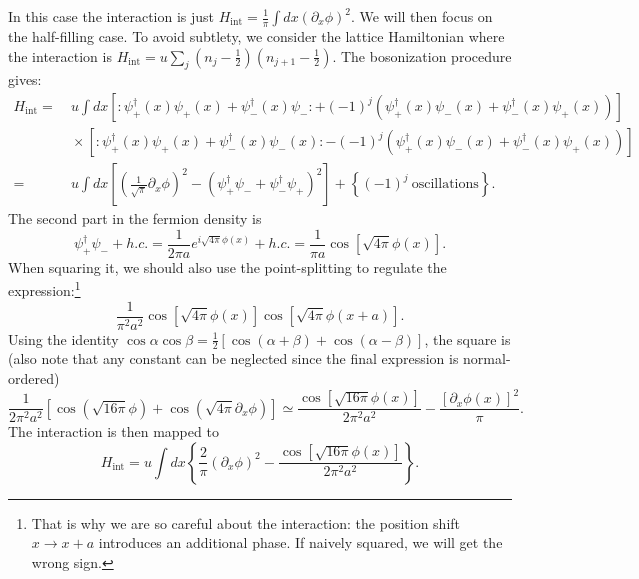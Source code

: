 \documentclass{SciPost}
\begin{document}
In this case the interaction is just $H_\text{int} = \frac{1}{\pi}\int dx (\partial_x\phi)^2$.
We will then focus on the half-filling case.
To avoid subtlety, we consider the lattice Hamiltonian where the interaction is $H_\text{int} = u \sum_j \left(n_j-\frac{1}{2}\right) \left(n_{j+1}-\frac{1}{2} \right)$.
The bosonization procedure gives:
\begin{equation*}
\begin{aligned}
	H_\text{int} =& \ u \int dx \left[: \psi_+^{\dagger}(x) \psi_+(x)+\psi_-^{\dagger}(x) \psi_-:+(-1)^{j}\left(\psi_+^{\dagger}(x) \psi_-(x)+\psi_-^{\dagger}(x) \psi_+(x)\right)\right] \\
	&\ \times\left[: \psi_+^{\dagger}(x) \psi_+(x)+\psi_-^{\dagger}(x) \psi_-(x):-(-1)^{j}\left(\psi_+^{\dagger}(x) \psi_-(x)+\psi_-^{\dagger}(x) \psi_+(x)\right)\right] \\
	=&\ u\int dx \left[\left(\frac{1}{\sqrt{\pi}} \partial_{x} \phi\right)^{2}-\left(\psi_+^{\dagger} \psi_- + \psi_-^{\dagger} \psi_+\right)^{2} \right] 
		+\left\{(-1)^j\ \text{oscillations} \right\}.
\end{aligned}
\end{equation*}
The second part in the fermion density is
\begin{equation*}
	\psi_+^\dagger \psi_- + h.c.
	= \frac{1}{2\pi a} e^{i\sqrt{4\pi}\phi(x)} + h.c. 
	= \frac{1}{\pi a}\cos\left[\sqrt{4\pi}\phi(x)\right].
\end{equation*}
When squaring it, we should also use the point-splitting to regulate the expression:\footnote{That is why we are so careful about the interaction: the position shift $x\rightarrow x+a$ introduces an additional phase. If naively squared, we will get the wrong sign.}
\begin{equation*}
	\frac{1}{\pi^2 a^2} \cos\left[\sqrt{4\pi}\phi(x)\right]\cos\left[\sqrt{4\pi}\phi(x+a)\right].
\end{equation*}
Using the identity $\cos\alpha \cos\beta = \frac{1}{2}[\cos(\alpha+\beta)+\cos(\alpha-\beta)]$, the square is (also note that any constant can be neglected since the final expression is normal-ordered)
\begin{equation*}
	\frac{1}{2\pi^2 a^2}\left[\cos\left(\sqrt{16\pi}\phi\right)+\cos\left(\sqrt{4\pi}\partial_x\phi \right)\right]
	\simeq \frac{\cos\left[\sqrt{16\pi}\phi(x)\right]}{2\pi^2 a^2} - \frac{[\partial_x\phi(x)]^2}{\pi}.
\end{equation*}
The interaction is then mapped to
\begin{equation}
	H_\text{int} = u\int dx \left\{\frac{2}{\pi}(\partial_x\phi)^2 - \frac{\cos\left[\sqrt{16\pi}\phi(x)\right]}{2\pi^2 a^2}\right\}.
\end{equation}
\end{document}

